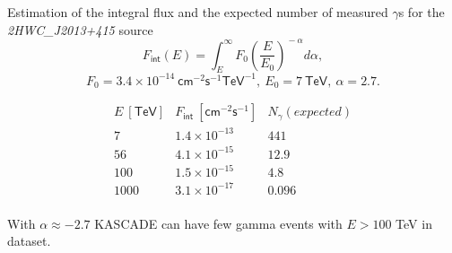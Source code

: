 \begin{frame}{Estimation of the integral flux and the expected number of measured $\gamma$s for the \textit{2HWC\_J2013+415} source}
\vspace{-3ex}
\[
F_\mathsf{int}(E) = \int_{E}^{\infty}F_0\left(\frac{E}{E_0}\right)^{\!\!-\alpha}d\alpha,
\]
\[
F_0 = 3.4\times10^{-14}~\mathsf{cm}^{-2} \mathsf{s}^{-1} \mathsf{TeV}^{-1},~
E_0 = 7~\mathsf{TeV},~
\alpha = 2.7.
\]

\vspace{-1ex}
\[
\begin{array}{ccc}
E~[\mathsf{TeV}] & F_\mathsf{int}~[\mathsf{cm}^{-2}\mathsf{s}^{-1}] & N_\gamma (expected) \\\hline
7  & 1.4\times10^{-13} & 441\\
56  & 4.1\times10^{-15} & 12.9\\
100 & 1.5\times10^{-15} & 4.8 \\
1000 & 3.1\times10^{-17} & 0.096\\
\end{array}
\]

\vspace{0.4ex}
\normalsize
With $\alpha \approx -2.7$ KASCADE can have few gamma events with $E > 100$ TeV in dataset.


\end{frame}
